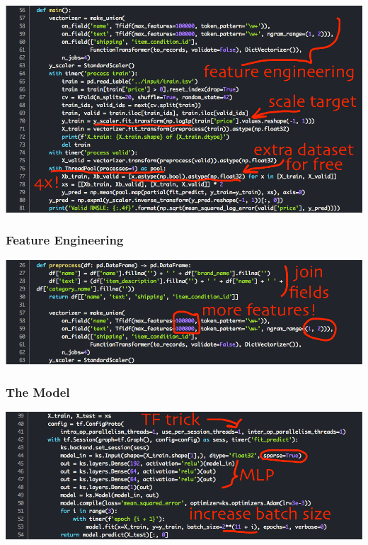 \begin{frame}
    \includegraphics[width=1.0\textwidth]{img/code_golf_2.png}
\end{frame}

\begin{frame}
    \frametitle{Feature Engineering}
    \includegraphics[width=1.0\textwidth]{img/code_golf_FE.png}
\end{frame}

\begin{frame}
    \frametitle{The Model}
    \includegraphics[width=1.0\textwidth]{img/code_golf_Model.png}
\end{frame}
